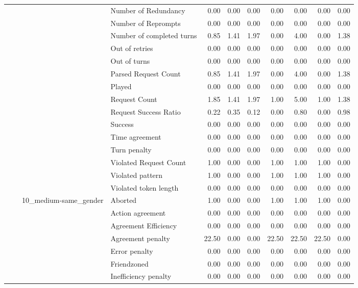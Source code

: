 \begin{tabular}{llllrrrrrrr}
 &  &  & Number of Redundancy & 0.00 & 0.00 & 0.00 & 0.00 & 0.00 & 0.00 & 0.00 \\
 &  &  & Number of Reprompts & 0.00 & 0.00 & 0.00 & 0.00 & 0.00 & 0.00 & 0.00 \\
 &  &  & Number of completed turns & 0.85 & 1.41 & 1.97 & 0.00 & 4.00 & 0.00 & 1.38 \\
 &  &  & Out of retries & 0.00 & 0.00 & 0.00 & 0.00 & 0.00 & 0.00 & 0.00 \\
 &  &  & Out of turns & 0.00 & 0.00 & 0.00 & 0.00 & 0.00 & 0.00 & 0.00 \\
 &  &  & Parsed Request Count & 0.85 & 1.41 & 1.97 & 0.00 & 4.00 & 0.00 & 1.38 \\
 &  &  & Played & 0.00 & 0.00 & 0.00 & 0.00 & 0.00 & 0.00 & 0.00 \\
 &  &  & Request Count & 1.85 & 1.41 & 1.97 & 1.00 & 5.00 & 1.00 & 1.38 \\
 &  &  & Request Success Ratio & 0.22 & 0.35 & 0.12 & 0.00 & 0.80 & 0.00 & 0.98 \\
 &  &  & Success & 0.00 & 0.00 & 0.00 & 0.00 & 0.00 & 0.00 & 0.00 \\
 &  &  & Time agreement & 0.00 & 0.00 & 0.00 & 0.00 & 0.00 & 0.00 & 0.00 \\
 &  &  & Turn penalty & 0.00 & 0.00 & 0.00 & 0.00 & 0.00 & 0.00 & 0.00 \\
 &  &  & Violated Request Count & 1.00 & 0.00 & 0.00 & 1.00 & 1.00 & 1.00 & 0.00 \\
 &  &  & Violated pattern & 1.00 & 0.00 & 0.00 & 1.00 & 1.00 & 1.00 & 0.00 \\
 &  &  & Violated token length & 0.00 & 0.00 & 0.00 & 0.00 & 0.00 & 0.00 & 0.00 \\
\cline{3-11}
 &  & \multirow[t]{27}{*}{10_medium-same_gender} & Aborted & 1.00 & 0.00 & 0.00 & 1.00 & 1.00 & 1.00 & 0.00 \\
 &  &  & Action agreement & 0.00 & 0.00 & 0.00 & 0.00 & 0.00 & 0.00 & 0.00 \\
 &  &  & Agreement Efficiency & 0.00 & 0.00 & 0.00 & 0.00 & 0.00 & 0.00 & 0.00 \\
 &  &  & Agreement penalty & 22.50 & 0.00 & 0.00 & 22.50 & 22.50 & 22.50 & 0.00 \\
 &  &  & Error penalty & 0.00 & 0.00 & 0.00 & 0.00 & 0.00 & 0.00 & 0.00 \\
 &  &  & Friendzoned & 0.00 & 0.00 & 0.00 & 0.00 & 0.00 & 0.00 & 0.00 \\
 &  &  & Inefficiency penalty & 0.00 & 0.00 & 0.00 & 0.00 & 0.00 & 0.00 & 0.00 \\

\end{tabular}
